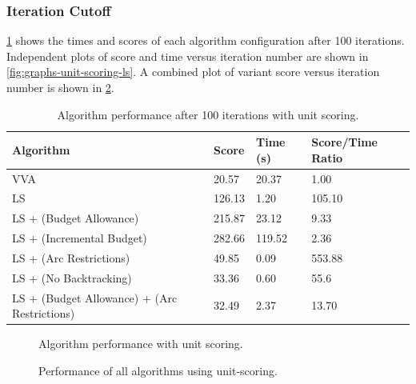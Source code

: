 \documentclass[honors]{union-cs-thesis}
\begin{document}
\subsubsection{Iteration Cutoff}
\label{sec:iteration-cutoff}
\cref{tab:unit-scoring-results} shows the times and scores of each algorithm configuration after 100 iterations. Independent plots of score and time versus iteration number are shown in \cref{fig:graphs-unit-scoring-ls}. A combined plot of variant score versus iteration number is shown in \cref{fig:graphs-combined-unit-scoring}.

\label{sec:unit-scoring}
\begin{table}
\begin{center}
\begin{tabular}{|l|l|l|l|}
    \hline
    \textbf{Algorithm} & \textbf{Score} & \textbf{Time (s)} & \textbf{Score/Time Ratio} \\
    \hline
    VVA & 20.57 & 20.37 & 1.00 \\
    \hline
    LS & 126.13 & 1.20 & 105.10 \\
    \hline
    LS + (Budget Allowance) & 215.87 & 23.12 & 9.33 \\
    \hline
    LS + (Incremental Budget) & 282.66 & 119.52 & 2.36 \\
    \hline
    LS + (Arc Restrictions) & 49.85 & 0.09 & 553.88 \\
    \hline
    LS + (No Backtracking) & 33.36 & 0.60 & 55.6 \\
    \hline
    LS + (Budget Allowance) + (Arc Restrictions) & 32.49 & 2.37 & 13.70  \\
    \hline
\end{tabular}
\caption{Algorithm performance after 100 iterations with unit scoring.}
\label{tab:unit-scoring-results}
\end{center}
\end{table}

\begin{figure}

\caption{Algorithm performance with unit scoring.}
\label{fig:graphs-unit-scoring}
\end{figure}


\begin{figure}

\caption{Performance of all algorithms using unit-scoring.}
\label{fig:graphs-combined-unit-scoring}
\end{figure}
\end{document}
